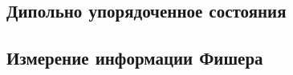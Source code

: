\subsection{Дипольно упорядоченное состояния}


\subsection{Измерение информации Фишера}
% 
% 
% 
% 
% 
% 
% 
% 
